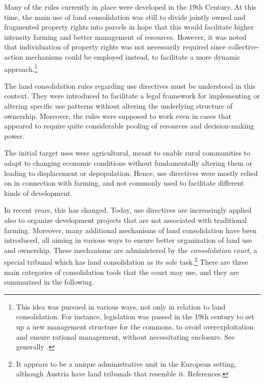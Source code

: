 Many of the rules currently in place were developed in the 19th Century. At this time, the main use of land consolidation was still to divide jointly owned and fragmented property rights into parcels in hope that this would facilitate higher intensity farming and better management of resources. However, it was noted that individuation of property rights was not necessarily required since collective-action mechanisms could be employed instead, to facilitate a more dynamic approach.\footnote{This idea was pursued in various ways, not only in relation to land consolidation. For instance, legislation was passed in the 19th century to set up a new management structure for the commons, to avoid overexploitation and ensure rational management, without necessitating enclosure. See generally \cite{stenseth10}.}

The land consolidation rules regarding use directives must be understood in this context. They were introduced to facilitate  a legal framework for implementing or altering specific use patterns without altering the underlying structure of ownership. Moreover, the rules were supposed to work even in cases that appeared to require quite considerable pooling of resources and decision-making power. 

The initial target uses were agricultural, meant to enable rural communities to adapt to changing economic conditions without fundamentally altering them or leading to displacement or depopulation. Hence, use directives were mostly relied on in connection with farming, and not commonly used to facilitate different kinds of development.

In recent years, this has changed. Today, use directives are increasingly applied also to organize development projects that are not associated with traditional farming. Moreover, many additional mechanisms of land consolidation have been introduced, all aiming in various ways to ensure better organization of land use and ownership. These mechanisms are administered by the \emph{consolidation court}, a special tribunal which has land consolidation as its sole task.\footnote{It appears to be a unique administrative unit in the European setting, although Austria have land tribunals that resemble it. References.} There are three main categories of consolidation tools that the court may use, and they are summarized in the following.

